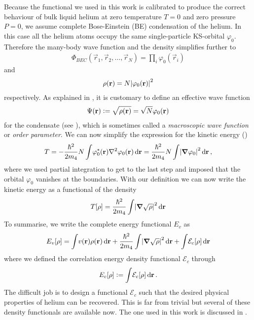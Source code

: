 		Because the functional we used in this work is calibrated to produce the correct behaviour of bulk liquid helium at zero temperature $T=0$ and zero pressure $P=0$, we assume complete Bose-Einstein (BE) condensation of the helium. In this case all the helium atoms occupy the same single-particle KS-orbital $\varphi_0$. Therefore the many-body wave function and the density simplifies further to
		\begin{align}
			\Phi_{BEC}(\vec{r}_1,\vec{r}_2,\ldots,\vec{r}_N)=\prod_i\varphi_0(\vec{r}_i)
		\end{align}
		 and
		 \begin{align}
		 	\rho(\vec{r})=N\absolutevalue{\varphi_0(\vec{r})}^2
		 \end{align}
		 respectively. As explained in , it is customary to define an effective wave function
		\begin{align}
			\Psi(\vec{r})\vcentcolon=\sqrt{\rho(\vec{r})}=\sqrt{N}\varphi_0(\vec{r}) \label{eq:order-param}	
		\end{align}
	 	for the condensate (see ), which is sometimes called a \emph{macroscopic wave function} or \emph{order parameter}. We can now simplify the expression for the kinetic energy ()
		\begin{align}
			T = -\frac{\hbar^2}{2m_4} N\int\! \varphi_0^*(\vec{r})\laplacian \varphi_0(\vec{r})\diff{r}
			 = \frac{\hbar^2}{2m_4} N\int\! \abs{\grad{\varphi_0}}^2\diff{r}\,, \label{eq5}
		\end{align}	
		where we used partial integration to get to the last step and imposed that the orbital $\varphi_0$ vanishes at the boundaries. With our definition  we can now write the kinetic energy as a functional of the density
		\begin{align}
			T[\rho] = \frac{\hbar^2}{2m_4} \int\! \abs{\grad{\sqrt{\rho}}}^2\diff{r} 
		\end{align}
		To summarise, we write the complete energy functional $E_v$ as
		\begin{align}
			E_v[\rho] = \int\!v(\vec{r})\rho(\vec{r})\diff{r} + \frac{\hbar^2}{2m_4} \int\! \abs{\grad{\sqrt{\rho}}}^2\diff{r} + \int\!\mathcal{E}_c[\rho]\diff{r} \label{eq:ks-tot-energy}
		\end{align}
		where we defined the correlation energy density functional $\mathcal{E}_c$ through
		\begin{align}
			E_c[\rho] \vcentcolon= \int\!\mathcal{E}_c[\rho]\diff{r}\,.
		\end{align}
		The difficult job is to design a functional $\mathcal{E}_c$ such that the desired physical properties of helium can be recovered. This is far from trivial but several of these density functionals are available now. The one used in this work is discussed in .
	
